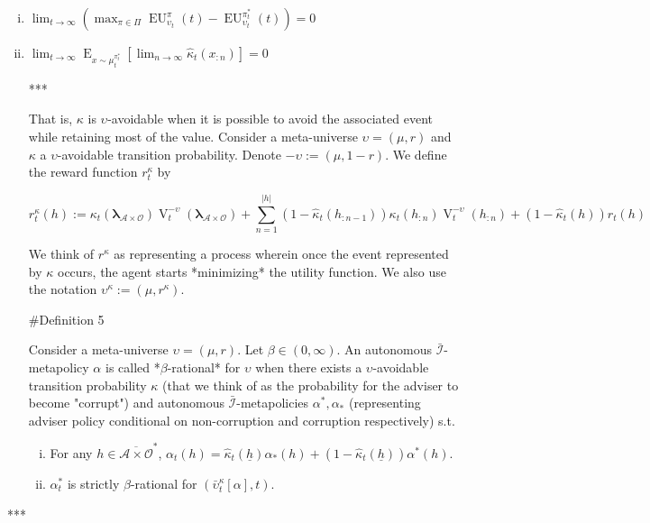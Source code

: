 \documentclass[a4paper]{article}
\DeclareMathOperator{\E}{E}
\newcommand{\Estr}{\boldsymbol{\lambda}}
\newcommand{\Abs}[1]{\lvert #1 \rvert}
\newcommand{\Ob}{\mathcal{O}}
\newcommand{\A}{\mathcal{A}}
\newcommand{\I}{\mathcal{I}}
\newcommand{\Adi}{\bar{\I}}
\newcommand{\Adao}{\overline{\A \times \Ob}}
\newcommand{\Adfh}{\Adao^*}
\newcommand{\V}{\operatorname{V}}
\newcommand{\EU}{\operatorname{EU}}
\begin{document}
\begin{enumerate}[i.]

\item $\lim_{t \rightarrow \infty} {(\max_{\pi \in \Pi} \EU_{\upsilon_t}^{\pi}(t)-\EU_{\upsilon_t}^{\pi^*_t}(t))} = 0$
\item $\lim_{t \rightarrow \infty} \E_{x \sim \mu_t^{\pi^*_t}}[\lim_{n \rightarrow \infty} \hat{\kappa}_t(x_{:n})] = 0$

***

That is, $\kappa$ is $\upsilon$-avoidable when it is possible to avoid the associated event while retaining most of the value. Consider a meta-universe $\upsilon=(\mu,r)$ and $\kappa$ a $\upsilon$-avoidable transition probability. Denote $-\upsilon:=(\mu,1-r)$. We define the reward function $r^\kappa_t$ by

$$r^\kappa_t(h):=\kappa_t(\Estr_{\A \times \Ob}) \V^{-\upsilon}_t(\Estr_{\A \times \Ob})+\sum_{n=1}^{\Abs{h}} (1-\hat{\kappa}_t(h_{:n-1}))\kappa_t(h_{:n}) \V^{-\upsilon}_t(h_{:n})+(1-\hat{\kappa}_t(h))r_t(h)$$

We think of $r^\kappa$ as representing a process wherein once the event represented by $\kappa$ occurs, the agent starts *minimizing* the utility function. We also use the notation $\upsilon^\kappa:=(\mu,r^\kappa)$.

\#Definition 5

Consider a meta-universe $\upsilon=(\mu,r)$. Let $\beta \in (0,\infty)$. An autonomous $\Adi$-metapolicy $\alpha$ is called *$\beta$-rational* for $\upsilon$ when there exists a $\upsilon$-avoidable transition probability $\kappa$ (that we think of as the probability for the adviser to become "corrupt") and autonomous $\Adi$-metapolicies $\alpha^*,\alpha_*$ (representing adviser policy conditional on non-corruption and corruption respectively) s.t. 

\begin{enumerate}[i.]

\item For any $h \in \Adfh$, $\alpha_t(h) = \hat{\kappa}_t(\underline{h}) \alpha_*(h) + (1 - \hat{\kappa}_t(\underline{h}))\alpha^*(h)$.
\item $\alpha^*_t$ is strictly $\beta$-rational for $(\bar{\upsilon}^\kappa_t[\alpha], t)$.

\end{enumerate}

\end{enumerate}

***
\end{document}
